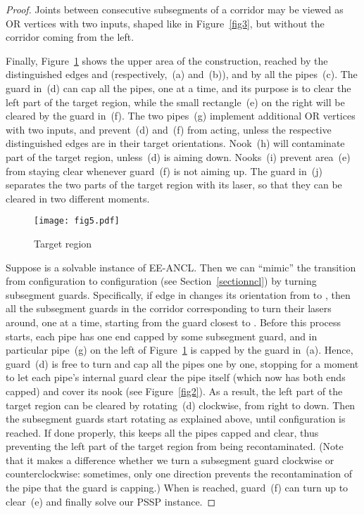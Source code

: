 \documentclass{style}
\newcommand{\computproblem}[1]{\textsc{#1}}
\newcommand{\EEANCL}{\computproblem{EE-ANCL}\xspace}
\newcommand{\PSSP}{\computproblem{PSSP}\xspace}
\begin{document}
\begin{proof}
Joints between consecutive subsegments of a corridor may be viewed as OR vertices with two inputs, shaped like in Figure~\ref{fig3}, but without the corridor coming from the left.

Finally, Figure~\ref{fig5} shows the upper area of the construction, reached by the distinguished edges  and  (respectively,~(a) and~(b)), and by all the pipes~(c). The guard in~(d) can cap all the pipes, one at a time, and its purpose is to clear the left part of the target region, while the small rectangle~(e) on the right will be cleared by the guard in~(f). The two pipes~(g) implement additional OR vertices with two inputs, and prevent~(d) and~(f) from acting, unless the respective distinguished edges are in their target orientations. Nook~(h) will contaminate part of the target region, unless~(d) is aiming down. Nooks~(i) prevent area~(e) from staying clear whenever guard~(f) is not aiming up. The guard in~(j) separates the two parts of the target region with its laser, so that they can be cleared in two different moments.

\begin{figure}[h]
\centering
\texttt{[image: fig5.pdf]}
\caption{Target region}
\label{fig5}
\end{figure}

Suppose  is a solvable instance of \EEANCL. Then we can ``mimic'' the transition from configuration  to configuration  (see Section~\ref{sectionncl}) by turning subsegment guards. Specifically, if edge  in  changes its orientation from  to , then all the subsegment guards in the corridor corresponding to  turn their lasers around, one at a time, starting from the guard closest to . Before this process starts, each pipe has one end capped by some subsegment guard, and in particular pipe~(g) on the left of Figure~\ref{fig5} is capped by the guard in~(a). Hence, guard~(d) is free to turn and cap all the pipes one by one, stopping for a moment to let each pipe's internal guard clear the pipe itself (which now has both ends capped) and cover its nook (see Figure~\ref{fig2}). As a result, the left part of the target region can be cleared by rotating~(d) clockwise, from right to down. Then the subsegment guards start rotating as explained above, until configuration  is reached. If done properly, this keeps all the pipes capped and clear, thus preventing the left part of the target region from being recontaminated. (Note that it makes a difference whether we turn a subsegment guard clockwise or counterclockwise: sometimes, only one direction prevents the recontamination of the pipe that the guard is capping.) When  is reached, guard~(f) can turn up to clear~(e) and finally solve our \PSSP instance.


\end{proof}
\end{document}
